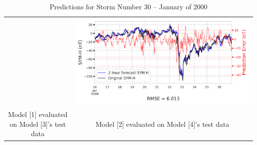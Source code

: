 \documentclass[draft,sw]{agutexSI2019}
\begin{document}
\begin{table}
\begin{tabular}{cc}
&
\includegraphics[width=0.49\linewidth]{paper_plots/2h_swics_model_on_no_swics/2h_swics_model_on_no_swics_storm_30.png}
\\
Model [1] evaluated on Model [3]'s test data & Model [2] evaluated on Model [4]'s test data
\vspace*{12pt}
\\
\end{tabular}
\caption{Predictions for Storm Number 30 -- January of 2000}
\label{storm-30}
\end{table}
\end{document}
